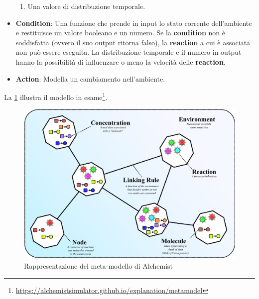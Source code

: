 \begin{itemize}
\begin{enumerate}
		\item Una valore di distribuzione temporale.
	\end{enumerate}
	\item \textbf{Condition}: Una funzione che prende in input lo stato corrente dell'ambiente e restituisce un valore booleano e un numero. Se la \textbf{condition} non è soddisfatta (ovvero il suo output ritorna falso), la \textbf{reaction} a cui è associata non può essere eseguita. La distribuzione temporale e il numero in output hanno la possibilità di influenzare o meno la velocità delle \textbf{reaction}.
	\item \textbf{Action}: Modella un cambiamento nell'ambiente.
\end{itemize}

La \cref{fig:alchemist-model} illustra il modello in esame\footnote{\url{https://alchemistsimulator.github.io/explanation/metamodel}}.

\begin{figure}
	\centering
	\includegraphics[width=.85\linewidth]{imgs/alchemist_meta_model.pdf}
	\caption{Rappresentazione del meta-modello di Alchemist}
	\label{fig:alchemist-model}
\end{figure}

